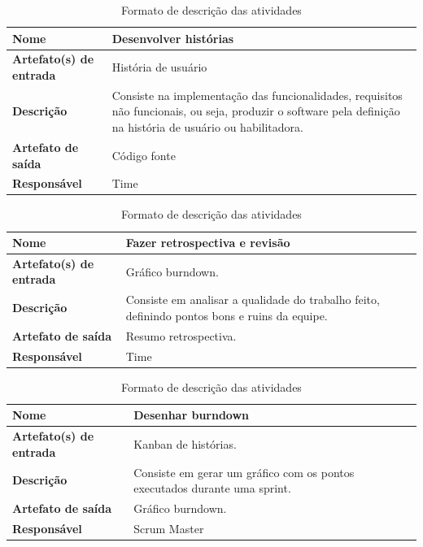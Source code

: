 \begin{table}[h]
    \centering
    \label{descricaoAtividades}
    \caption{Formato de descrição das atividades}
        \begin{tabular}{|l|p{10cm}|}
        \hline
        \textbf{Nome} & Desenvolver histórias \\
        \hline
        \textbf{Artefato(s) de entrada} & História de usuário \\
        \hline
        \textbf{Descrição} & Consiste na implementação das funcionalidades, requisitos não funcionais, ou seja, produzir o software pela definição na história de usuário ou habilitadora. \\
        \hline
        \textbf{Artefato de saída} & Código fonte \\
        \hline
        \textbf{Responsável} & Time \\
        \hline
    \end{tabular}
\end{table}

\begin{table}[h]
    \centering
    \label{descricaoAtividades}
    \caption{Formato de descrição das atividades}
        \begin{tabular}{|l|p{10cm}|}
        \hline
        \textbf{Nome} & Fazer retrospectiva e revisão \\
        \hline
        \textbf{Artefato(s) de entrada} & Gráfico burndown. \\
        \hline
        \textbf{Descrição} & Consiste em analisar a qualidade do trabalho feito, definindo pontos bons e ruins da equipe. \\
        \hline
        \textbf{Artefato de saída} & Resumo retrospectiva. \\
        \hline
        \textbf{Responsável} & Time \\
        \hline
    \end{tabular}
\end{table}

\begin{table}[h]
    \centering
    \label{descricaoAtividades}
    \caption{Formato de descrição das atividades}
        \begin{tabular}{|l|p{10cm}|}
        \hline
        \textbf{Nome} & Desenhar burndown \\
        \hline
        \textbf{Artefato(s) de entrada} & Kanban de histórias. \\
        \hline
        \textbf{Descrição} & Consiste em gerar um gráfico com os pontos executados durante uma sprint. \\
        \hline
        \textbf{Artefato de saída} & Gráfico burndown. \\
        \hline
        \textbf{Responsável} & Scrum Master \\
        \hline
    \end{tabular}
\end{table}

